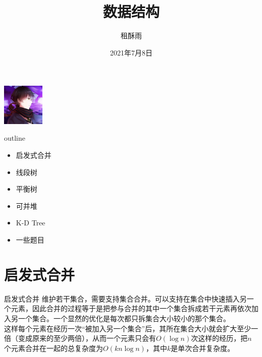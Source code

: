 \documentclass{beamer}
\title{数据结构}
\author{租酥雨}
\date{2021年7月8日}
\begin{document}
\small
	\begin{frame}
	\titlepage
		\begin{center}
		\includegraphics[width=2.0cm]{zsy.jpg}
		\end{center}
	\end{frame}
\begin{frame}{outline}
\begin{itemize}
	\item 启发式合并
	\item 线段树
	\item 平衡树
	\item 可并堆
	\item K-D Tree
	\item 一些题目
\end{itemize}
\end{frame}
\section{启发式合并}
\begin{frame}{启发式合并}
	维护若干集合，需要支持集合合并。可以支持在集合中快速插入另一个元素，因此合并的过程等于是把参与合并的其中一个集合拆成若干元素再依次加入另一个集合。一个显然的优化是每次都只拆集合大小较小的那个集合。\\
	
	这样每个元素在经历一次“被加入另一个集合”后，其所在集合大小就会扩大至少一倍（变成原来的至少两倍），从而一个元素只会有$O(\log n)$次这样的经历，把$n$个元素合并在一起的总复杂度为$O(kn\log n)$，其中$k$是单次合并复杂度。
\end{frame}
\end{document}
